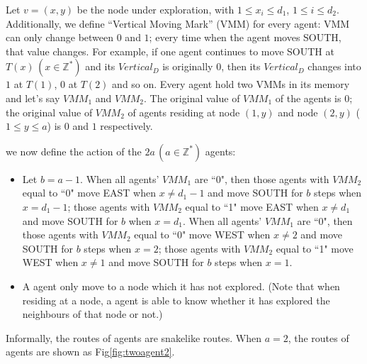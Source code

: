 Let $v=(x, y)$ be the node under exploration, with $1\leq x_i \leq d_1$, $1\leq i \leq d_2$. Additionally, we define ``Vertical Moving Mark'' (VMM) for every agent: VMM can only change between $0$ and $1$; every time when the agent moves SOUTH, that value changes. For example, if one agent continues to move SOUTH at $T(x)\,(x\in\mathbb{Z}^*)$ and its $Vertical_D$ is originally $0$, then its $Vertical_D$ changes into $1$ at $T(1)$, $0$ at $T(2)$ and so on.
Every agent hold two VMMs in its memory and let's say $VMM_1$ and $VMM_2$. The original value of $VMM_1$ of the agents is $0$; the original value of $VMM_2$ of agents residing at node $(1, y)$ and node $(2, y)$ ($1\leq y\leq a$) is $0$ and $1$ respectively. 

we now define the action of the $2a\,(a\in\mathbb{Z}^*)$ agents:\\ 
\begin{itemize}
\item Let $b=a-1$. When all agents' $VMM_1$ are ``0", then those agents with $VMM_2$ equal to ``0" move EAST when $x\neq d_1-1$ and move SOUTH for $b$ steps when $x=d_1-1$; those agents with $VMM_2$ equal to ``1" move EAST when $x\neq d_1$ and move SOUTH for $b$ when $x=d_1$. When all agents' $VMM_1$ are ``0", then those agents with $VMM_2$ equal to ``0"  move WEST when $x\neq2$ and move SOUTH for $b$ steps when $x=2$; those agents with $VMM_2$ equal to ``1" move WEST when $x\neq 1$ and move SOUTH for $b$ steps when $x=1$.
\item A agent only move to a node which it has not explored. (Note that when residing at a node, a agent is able to know whether it has explored the neighbours of that node or not.)
\end{itemize}
Informally, the routes of agents are snakelike routes. When $a=2$, the routes of agents are shown as Fig\ref{fig:twoagent2}.
